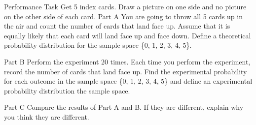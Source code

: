 \documentclass{article}
\newenvironment{practice}[2]{}{}        %
\newcommand{\answer}[1]{}               %
\newcommand{\te}[1]{}                   %
\begin{document}
\begin{practice}{32}{3}
Performance Task Get 5 index cards. Draw a picture on one side and no picture on the other side of each card.
Part A You are going to throw all 5 cards up in the air and count the number of cards that land face up. Assume that it is equally likely that each card will land face up and face down. Define a theoretical probability distribution for the sample space \{0, 1, 2, 3, 4, 5\}.
\answer{Part A. The theoretical probability distribution is the function P defined on \{0, 1, 2, 3, 4, 5\} with (P(0)=0.03125), (P(1)=0.15625), (P(2)=0.3125), (P(3)=0.3125), (P(4)=0.15625), (P(5)=0.03125). (Accept fractions, decimals, or percents.)}
Part B Perform the experiment 20 times. Each time you perform the experiment, record the number of cards that land face up. Find the experimental probability for each outcome in the sample space \{0, 1, 2, 3, 4, 5\} and define an experimental probability distribution the sample space.
\te{Printed omits on before the sample space.}
\answer{Part B. Answers may vary. Sample: The experimental probability distribution is the function P defined on the set \{0, 1, 2, 3, 4, 5\} such that (P(0)=0.05), (P(1)=0.1), (P(2)=0.3), (P(3)=0.35), (P(4)=0.2), (P(5)=0).}
Part C Compare the results of Part A and B. If they are different, explain why you think they are different.
\answer{Part C. The experimental probability distribution is like but not the same as the theoretical distribution. A theoretical probability distribution describes the results to expect from an experiment repeated many times, not only 20 times.}
\end{practice}
\end{document}
